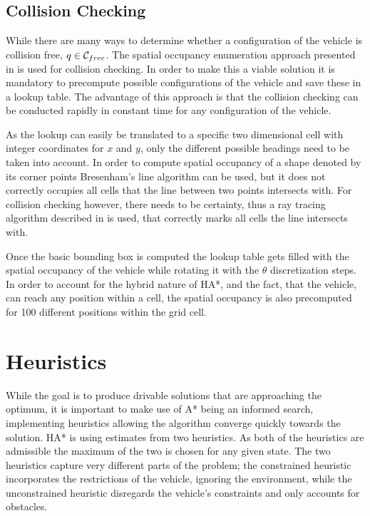 \subsection{Collision Checking}
While there are many ways to determine whether a configuration of the vehicle is collision free, $q \in \mathcal{C}_{free}$. The spatial occupancy enumeration approach presented in  is used for collision checking. In order to make this a viable solution it is mandatory to precompute possible configurations of the vehicle and save these in a lookup table. The advantage of this approach is that the collision checking can be conducted rapidly in constant time for any configuration of the vehicle.

As the lookup can easily be translated to a specific two dimensional cell with integer coordinates for $x$ and $y$, only the different possible headings need to be taken into account. In order to compute spatial occupancy of a shape denoted by its corner points Bresenham's line algorithm can be used, but it does not correctly occupies all cells that the line between two points intersects with. For collision checking however, there needs to be certainty, thus a ray tracing algorithm described in \cite{Amanatides.2011} is used, that correctly marks all cells the line intersects with.

Once the basic bounding box is computed the lookup table gets filled with the spatial occupancy of the vehicle while rotating it with the $\theta$ discretization steps. In order to account for the hybrid nature of HA*, and the fact, that the vehicle, can reach any position within a cell, the spatial occupancy is also precomputed for 100 different positions within the grid cell.

\section{Heuristics}
While the goal is to produce drivable solutions that are approaching the optimum, it is important to make use of A* being an informed search, implementing heuristics allowing the algorithm converge quickly towards the solution. HA* is using estimates from two heuristics. As both of the heuristics are admissible the maximum of the two is chosen for any given state. The two heuristics capture very different parts of the problem; the constrained heuristic incorporates the restrictions of the vehicle, ignoring the environment, while the unconstrained heuristic disregards the vehicle's constraints and only accounts for obstacles.

